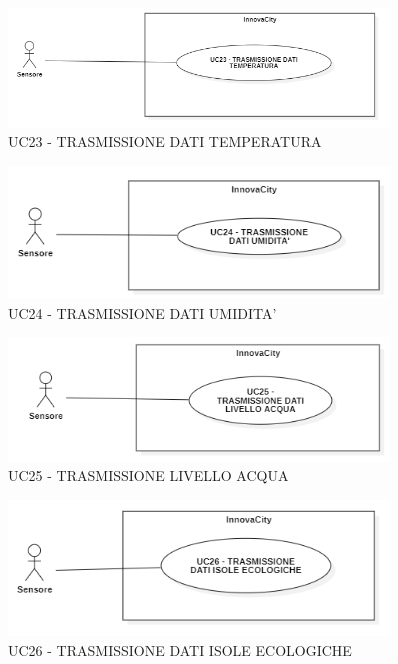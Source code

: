 \begin{figure}[H]
    \centering
    \includegraphics[width=0.9\textwidth]{../Images/uc23.PNG}
    \caption{UC23 - TRASMISSIONE DATI TEMPERATURA}
\end{figure}

\begin{figure}[H]
    \centering
    \includegraphics[width=0.9\textwidth]{../Images/uc24.PNG}
    \caption{UC24 - TRASMISSIONE DATI UMIDITA'}
\end{figure}

\begin{figure}[H]
    \centering
    \includegraphics[width=0.9\textwidth]{../Images/uc25.PNG}
    \caption{UC25 - TRASMISSIONE LIVELLO ACQUA}
\end{figure}

\begin{figure}[H]
    \centering
    \includegraphics[width=0.9\textwidth]{../Images/uc26.PNG}
    \caption{UC26 - TRASMISSIONE DATI ISOLE ECOLOGICHE}
\end{figure}
